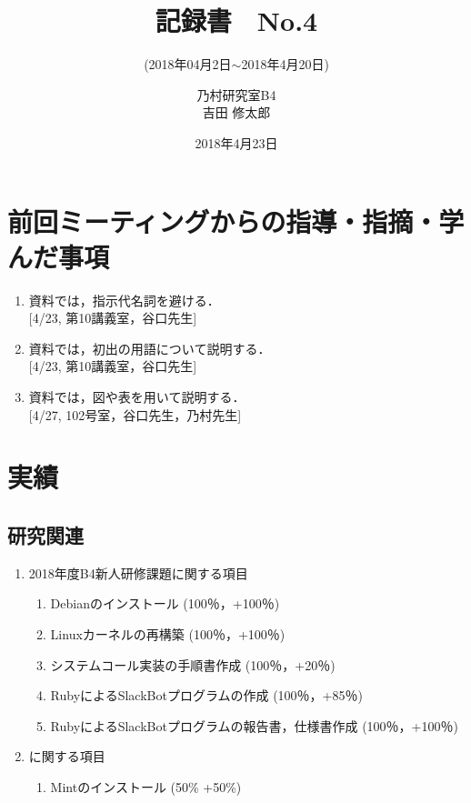 \documentclass[fleqn, 14pt]{extarticle}
\subtitle{(2018年04月2日$\sim$2018年4月20日)}
\author{乃村研究室B4\\吉田 修太郎}
\date{2018年4月23日}
\title{記録書　No.4}
\begin{document}
\maketitle
\section{前回ミーティングからの指導・指摘・学んだ事項}
\label{sec1}
\begin{enumerate}
\item 資料では，指示代名詞を避ける．\\
  \hfill[4/23, 第10講義室，谷口先生]
\item 資料では，初出の用語について説明する．\\
  \hfill[4/23, 第10講義室，谷口先生]
\item 資料では，図や表を用いて説明する．\\
  \hfill[4/27, 102号室，谷口先生，乃村先生]
\end{enumerate}

\section{実績}
\label{sec2}
\subsection{研究関連}
\label{sec2-1}
\begin{enumerate}
\item 2018年度B4新人研修課題に関する項目
  \hfill
  \label{sec2-1-1}
  \begin{enumerate}
  \item Debianのインストール
    \hfill
    \label{sec2-1-1-enum1}
    (100％，+100％)
  \item Linuxカーネルの再構築
    \hfill
    \label{sec2-1-1-enum2}
    (100％，+100％)
  \item システムコール実装の手順書作成
    \hfill
    \label{sec2-1-1-enum3}
    (100％，+20％)
  \item RubyによるSlackBotプログラムの作成
    \hfill
    \label{sec2-1-1-enum4}
    (100％，+85％)
  \item RubyによるSlackBotプログラムの報告書，仕様書作成
    \hfill
    \label{sec2-1-1-enum5}
    (100％，+100％)
  \end{enumerate}
\item に関する項目
  \label{sec2-1-2}
  \begin{enumerate}
  \item Mintのインストール
    \label{sec2-1-2-enum1}
    \hfill
    (50\% +50\%)
  \end{enumerate}
\end{enumerate}
\end{document}

